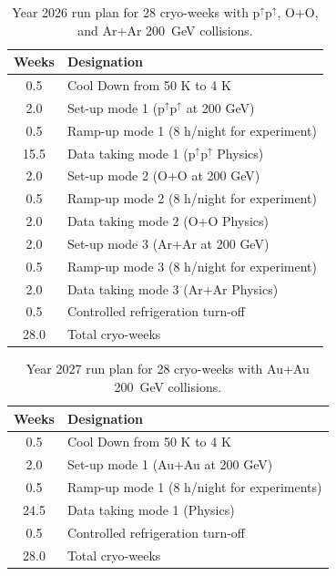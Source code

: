 \begin{table}[hb!]
\centering
\begin{tabular}{ | c | l | }
\hline
Weeks & Designation \\ \hline
0.5  & Cool Down from 50 K to 4 K \\ \hline
2.0  & Set-up mode 1 (p$^{\uparrow}$p$^{\uparrow}$ at 200 GeV) \\ \hline
0.5  & Ramp-up mode 1 (8 h/night for experiment) \\ \hline
15.5 & Data taking mode 1 (p$^{\uparrow}$p$^{\uparrow}$ Physics) \\ \hline
2.0  & Set-up mode 2 (O+O at 200 GeV) \\ \hline
0.5  & Ramp-up mode 2 (8 h/night for experiment) \\ \hline
2.0 & Data taking mode 2 (O+O Physics) \\ \hline
2.0  & Set-up mode 3 (Ar+Ar at 200 GeV) \\ \hline
0.5  & Ramp-up mode 3 (8 h/night for experiment) \\ \hline
2.0 & Data taking mode 3 (Ar+Ar Physics) \\ \hline
0.5  & Controlled refrigeration turn-off \\ \hline \hline \hline
28.0 & Total cryo-weeks \\
\hline
\end{tabular}
\caption{Year 2026 run plan for 28 cryo-weeks with p$^{\uparrow}$p$^{\uparrow}$, O+O, and Ar+Ar 200~GeV collisions.\label{tab:cryoplan2026}}
\end{table}


\begin{table}
\centering
\begin{tabular}{ | c | l | }
\hline
Weeks & Designation \\ \hline
0.5  & Cool Down from 50 K to 4 K \\ \hline
2.0  & Set-up mode 1 (Au+Au at 200 GeV) \\ \hline
0.5  & Ramp-up mode 1 (8 h/night for experiments) \\ \hline
24.5 & Data taking mode 1 (Physics) \\ \hline
0.5  & Controlled refrigeration turn-off \\ \hline \hline \hline
28.0 & Total cryo-weeks \\
\hline
\end{tabular}
\caption{Year 2027 run plan for 28 cryo-weeks with Au+Au 200~GeV collisions.
\label{tab:cryoplan2027}}
\end{table}